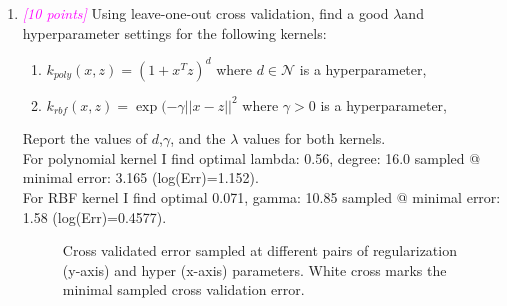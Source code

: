 \documentclass{article}
\newcommand{\1}{\mathbf{1}}
\newcommand{\N}{\mathcal{N}} %
\newcommand{\points}[1]{\small\textcolor{magenta}{\emph{[#1 points]}} \normalsize}
\begin{document}
\begin{enumerate}
    \item \points{10} Using leave-one-out cross validation, find a good $\lambda$and hyperparameter settings for the following kernels:
    \begin{enumerate}
        \item $k_{poly}(x,z) = (1 +x^Tz)^d$ where $d\in\N$ is a hyperparameter,
        \item $k_{rbf}(x,z) = \exp(-\gamma ||x-z||^2$ where $\gamma>0$ is a hyperparameter,
    \end{enumerate} Report the values of $d$,$\gamma$, and the $\lambda$ values for both kernels.\\
    
    For polynomial kernel I find optimal lambda: 0.56, degree: 16.0 sampled @ minimal error: 3.165 (log(Err)=1.152).\\
    For RBF kernel I find optimal 0.071, gamma: 10.85 sampled @ minimal error: 1.58 (log(Err)=0.4577).
    \begin{figure}[h!]
        \centering 
        \caption{Cross validated error sampled at different pairs of regularization (y-axis) and hyper (x-axis) parameters. White cross marks the minimal sampled cross validation error.}
    \end{figure}



\end{enumerate}
\end{document}
